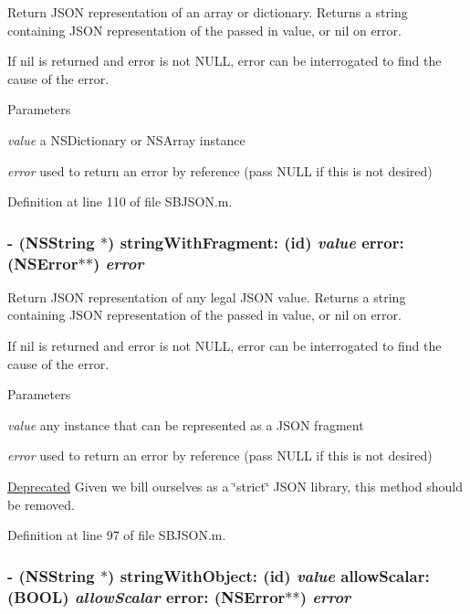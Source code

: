 Return JSON representation of an array or dictionary. Returns a string containing JSON representation of the passed in value, or nil on error.

If nil is returned and {\ttfamily error} is not NULL, {\ttfamily error} can be interrogated to find the cause of the error.


\begin{DoxyParams}{Parameters}
\item[{\em value}]a NSDictionary or NSArray instance \item[{\em error}]used to return an error by reference (pass NULL if this is not desired) \end{DoxyParams}


Definition at line 110 of file SBJSON.m.\hypertarget{interface_s_b_j_s_o_n_a9289d1d536954874498df4143c55ee80}{
\subsubsection[{stringWithFragment:error:}]{\setlength{\rightskip}{0pt plus 5cm}-\/ ({\bf NSString} $\ast$) stringWithFragment: (id) {\em value}\/ error: (NSError$\ast$$\ast$) {\em error}}}
\label{interface_s_b_j_s_o_n_a9289d1d536954874498df4143c55ee80}


Return JSON representation of any legal JSON value. Returns a string containing JSON representation of the passed in value, or nil on error.

If nil is returned and {\ttfamily error} is not NULL, {\ttfamily error} can be interrogated to find the cause of the error.


\begin{DoxyParams}{Parameters}
\item[{\em value}]any instance that can be represented as a JSON fragment \item[{\em error}]used to return an error by reference (pass NULL if this is not desired)\end{DoxyParams}
\begin{Desc}
\item[\hyperlink{deprecated__deprecated000004}{Deprecated}]Given we bill ourselves as a \char`\"{}strict\char`\"{} JSON library, this method should be removed. \end{Desc}


Definition at line 97 of file SBJSON.m.\hypertarget{interface_s_b_j_s_o_n_adfe4a880ee09edf0c9d14508d79311d8}{
\subsubsection[{stringWithObject:allowScalar:error:}]{\setlength{\rightskip}{0pt plus 5cm}-\/ ({\bf NSString} $\ast$) stringWithObject: (id) {\em value}\/ allowScalar: (BOOL) {\em allowScalar}\/ error: (NSError$\ast$$\ast$) {\em error}}}
\label{interface_s_b_j_s_o_n_adfe4a880ee09edf0c9d14508d79311d8}


